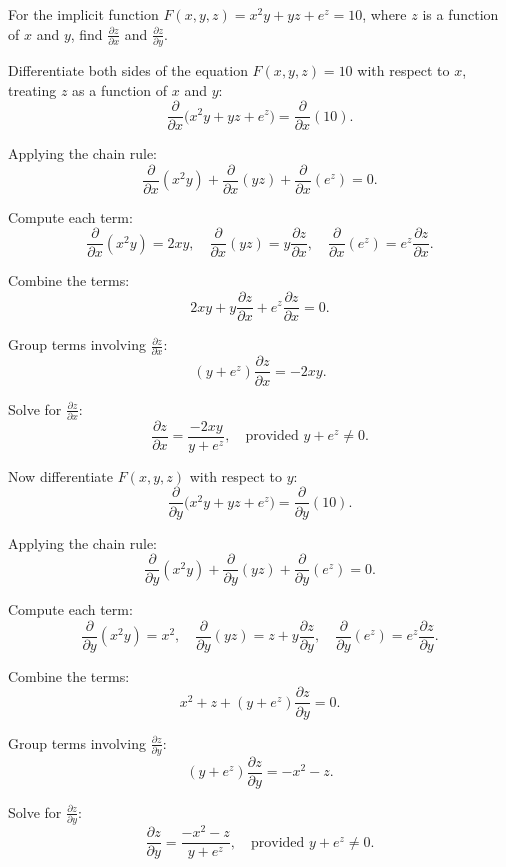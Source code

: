 \exampleline
\begin{example}
For the implicit function \( F(x, y, z) = x^2y + yz + e^z = 10 \), where \( z \) is a function of \( x \) and \( y \), find \( \frac{\partial z}{\partial x} \) and \( \frac{\partial z}{\partial y} \).

\begin{solution}
Differentiate both sides of the equation \( F(x, y, z) = 10 \) with respect to \( x \), treating \( z \) as a function of \( x \) and \( y \):
\[
\frac{\partial}{\partial x} \big(x^2y + yz + e^z\big) = \frac{\partial}{\partial x}(10).
\]

Applying the chain rule:
\[
\frac{\partial}{\partial x}(x^2y) + \frac{\partial}{\partial x}(yz) + \frac{\partial}{\partial x}(e^z) = 0.
\]

Compute each term:
\[
\frac{\partial}{\partial x}(x^2y) = 2xy, \quad \frac{\partial}{\partial x}(yz) = y \frac{\partial z}{\partial x}, \quad \frac{\partial}{\partial x}(e^z) = e^z \frac{\partial z}{\partial x}.
\]

Combine the terms:
\[
2xy + y \frac{\partial z}{\partial x} + e^z \frac{\partial z}{\partial x} = 0.
\]

Group terms involving \( \frac{\partial z}{\partial x} \):
\[
\left(y + e^z\right) \frac{\partial z}{\partial x} = -2xy.
\]

Solve for \( \frac{\partial z}{\partial x} \):
\[
\frac{\partial z}{\partial x} = \frac{-2xy}{y + e^z}, \quad \text{provided } y + e^z \neq 0.
\]

Now differentiate \( F(x, y, z) \) with respect to \( y \):
\[
\frac{\partial}{\partial y} \big(x^2y + yz + e^z\big) = \frac{\partial}{\partial y}(10).
\]

Applying the chain rule:
\[
\frac{\partial}{\partial y}(x^2y) + \frac{\partial}{\partial y}(yz) + \frac{\partial}{\partial y}(e^z) = 0.
\]

Compute each term:
\[
\frac{\partial}{\partial y}(x^2y) = x^2, \quad \frac{\partial}{\partial y}(yz) = z + y \frac{\partial z}{\partial y}, \quad \frac{\partial}{\partial y}(e^z) = e^z \frac{\partial z}{\partial y}.
\]

Combine the terms:
\[
x^2 + z + \left(y + e^z\right) \frac{\partial z}{\partial y} = 0.
\]

Group terms involving \( \frac{\partial z}{\partial y} \):
\[
\left(y + e^z\right) \frac{\partial z}{\partial y} = -x^2 - z.
\]

Solve for \( \frac{\partial z}{\partial y} \):
\[
\frac{\partial z}{\partial y} = \frac{-x^2 - z}{y + e^z}, \quad \text{provided } y + e^z \neq 0.
\]
\end{solution}
\end{example}
\exampleline


